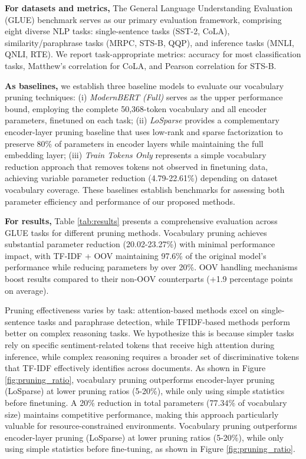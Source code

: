 \documentclass[twocolumn]{article}
\begin{document}
\textbf{For datasets and metrics,} 
The General Language Understanding Evaluation (GLUE) benchmark\cite{wang2018glue} serves as our primary evaluation framework, comprising eight diverse NLP tasks: single-sentence tasks (SST-2, CoLA), similarity/paraphrase tasks (MRPC, STS-B, QQP), and inference tasks (MNLI, QNLI, RTE). We report task-appropriate metrics: accuracy for most classification tasks, Matthew's correlation for CoLA, and Pearson correlation for STS-B. 

\textbf{As baselines,} 
we establish three baseline models to evaluate our vocabulary pruning techniques: 
(i) \textit{ModernBERT (Full)} serves as the upper performance bound, employing the complete 50,368-token vocabulary and all encoder parameters, finetuned on each task; 
(ii) \textit{LoSparse} provides a complementary encoder-layer pruning baseline that uses low-rank and sparse factorization to preserve 80\% of parameters in encoder layers while maintaining the full embedding layer; 
(iii) \textit{Train Tokens Only} represents a simple vocabulary reduction approach that removes tokens not observed in finetuning data, achieving variable parameter reduction (4.79-22.61\%) depending on dataset vocabulary coverage. 
These baselines establish benchmarks for assessing both parameter efficiency and performance of our proposed methods.

\textbf{For results,}
Table \ref{tab:results} presents a comprehensive evaluation across GLUE tasks for different pruning methods. 
% 
Vocabulary pruning achieves substantial parameter reduction (20.02-23.27\%) with minimal performance impact, with TF-IDF + OOV maintaining 97.6\% of the original model's performance while reducing parameters by over 20\%. OOV handling mechanisms boost results compared to their non-OOV counterparts (+1.9 percentage points on average). 

Pruning effectiveness varies by task: attention-based methods excel on single-sentence tasks and paraphrase detection, while TFIDF-based methods perform better on complex reasoning tasks. We hypothesize this is because simpler tasks rely on specific sentiment-related tokens that receive high attention during inference, while complex reasoning requires a broader set of discriminative tokens that TF-IDF effectively identifies across documents. As shown in Figure \ref{fig:pruning_ratio}, vocabulary pruning outperforms encoder-layer pruning (LoSparse) at lower pruning ratios (5-20\%), while only using simple statistics before finetuning. A 20\% reduction in total parameters (77.34\% of vocabulary size) maintains competitive performance, making this approach particularly valuable for resource-constrained environments.
Vocabulary pruning outperforms encoder-layer pruning (LoSparse) at lower pruning ratios (5-20\%), while only using simple statistics before fine-tuning, as shown in Figure \ref{fig:pruning_ratio}.
\end{document}
